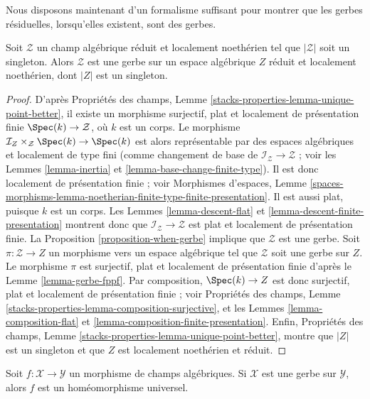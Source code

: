 \noindent
Nous disposons maintenant d'un formalisme suffisant pour montrer que les
gerbes résiduelles, lorsqu'elles existent, sont des gerbes.

\begin{lemma}
\label{lemma-noetherian-singleton-stack-gerbe}
Soit $\mathcal{Z}$ un champ algébrique réduit et localement noethérien tel que
$|\mathcal{Z}|$ soit un singleton. Alors $\mathcal{Z}$ est une gerbe sur
un espace algébrique $Z$ réduit et localement noethérien, dont $|Z|$ est un
singleton.
\end{lemma}

\begin{proof}
D'après Propriétés des champs, Lemme
\ref{stacks-properties-lemma-unique-point-better}, il existe un morphisme
surjectif, plat et localement de présentation finie
$\Spec(k) \to \mathcal{Z}$, où $k$ est un corps. Le morphisme
$\mathcal{I}_Z \times_\mathcal{Z} \Spec(k) \to \Spec(k)$ est alors
représentable par des espaces algébriques et localement de type fini (comme
changement de base de $\mathcal{I}_\mathcal{Z} \to \mathcal{Z}$ ; voir les
Lemmes \ref{lemma-inertia} et \ref{lemma-base-change-finite-type}). Il est donc
localement de présentation finie ; voir Morphismes d'espaces, Lemme
\ref{spaces-morphisms-lemma-noetherian-finite-type-finite-presentation}.
Il est aussi plat, puisque $k$ est un corps. Les
Lemmes \ref{lemma-descent-flat} et
\ref{lemma-descent-finite-presentation} montrent donc que
$\mathcal{I}_\mathcal{Z} \to \mathcal{Z}$ est plat et localement de
présentation finie. La Proposition \ref{proposition-when-gerbe} implique que
$\mathcal{Z}$ est une gerbe. Soit $\pi : \mathcal{Z} \to Z$ un morphisme vers
un espace algébrique tel que $\mathcal{Z}$ soit une gerbe sur $Z$.
Le morphisme $\pi$ est surjectif, plat et localement de présentation finie
d'après le Lemme \ref{lemma-gerbe-fppf}. Par composition,
$\Spec(k) \to Z$ est donc surjectif, plat et localement de présentation finie ;
voir Propriétés des champs, Lemme
\ref{stacks-properties-lemma-composition-surjective}, et les
Lemmes \ref{lemma-composition-flat} et
\ref{lemma-composition-finite-presentation}. Enfin, Propriétés des champs,
Lemme \ref{stacks-properties-lemma-unique-point-better}, montre que $|Z|$ est
un singleton et que $Z$ est localement noethérien et réduit.
\end{proof}

\begin{lemma}
\label{lemma-gerbe-bijection-points}
Soit $f : \mathcal{X} \to \mathcal{Y}$ un morphisme de champs algébriques.
Si $\mathcal{X}$ est une gerbe sur $\mathcal{Y}$, alors $f$ est un
homéomorphisme universel.
\end{lemma}

